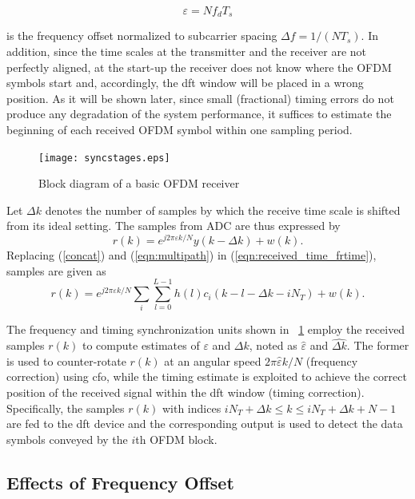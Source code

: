 \begin{equation}
\label{eqn:norm_freq_off}
\varepsilon = Nf_dT_s
\end{equation}

is the frequency offset normalized to subcarrier spacing $\Delta f =1/(NT_s)$.
In addition, since the time scales at the transmitter and the receiver are not perfectly aligned, at the start-up the receiver does not know where the OFDM symbols start and, accordingly, the \gls{dft} window will be placed in a wrong position. As it will be shown later, since small (fractional) timing errors do not produce any degradation of the system performance, it suffices to estimate the beginning of each received OFDM symbol within one sampling period.
%
\begin{figure}[thb]
\centering
\texttt{[image: syncstages.eps]}
\caption{Block diagram of a basic OFDM receiver\label{fig:receiver} }
\end{figure}
%
Let $\Delta k$ denotes the number of samples by which the receive time scale is shifted from its ideal setting. The samples from ADC are thus expressed by
%
\begin{equation}
\label{eqn:received_time_frtime}
r(k) =e^{j2\pi \varepsilon k/N}y(k-\Delta k) + w(k).
\end{equation}
%
Replacing (\ref{concat}) and (\ref{eqn:multipath}) in (\ref{eqn:received_time_frtime}), samples are given as
%
\begin{equation}
\label{eqn:received_time_all}
r(k) =e^{j2\pi \varepsilon k/N} \sum_i{}\sum_{l=0}^{L-1}{h(l)c_i(k-l-\Delta k-iN_T)}+ w(k).
\end{equation}

The frequency and timing synchronization units shown in ~\cref{fig:receiver} employ the received samples $r(k)$ to compute estimates of $\varepsilon$ and $\Delta k$, noted as $\hat{\varepsilon}$ and $\hat{\Delta k}$. The former is used to counter-rotate $r(k) $ at an angular speed $2\pi \hat{\varepsilon} k/N$ (frequency correction) using \gls{cfo}, while the timing estimate is exploited to achieve the correct position of the received signal within the \gls{dft} window (timing correction). Specifically, the samples $r(k)$ with indices $iN_T + \Delta k \leq k \leq iN_T + \Delta k + N - 1$ are fed to the \gls{dft} device and the corresponding output is used to detect the data symbols conveyed by the $i$th OFDM block.
\subsection{Effects of Frequency Offset}

